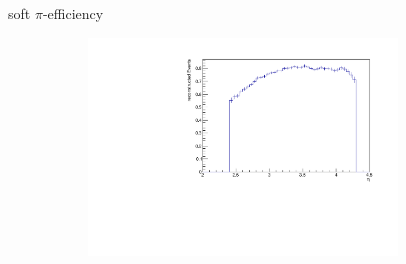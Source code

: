 \documentclass[11pt]{beamer}
\begin{document}
\begin{frame}{soft $\pi$-efficiency}
\begin{figure}
\begin{subfigure}{0.45\textwidth}
\end{subfigure}
\begin{subfigure}{0.45\textwidth}
\includegraphics[width=0.9\textwidth]{up_pdf/neg/h_eta_reco_SPi_neg.pdf}
\end{subfigure}
\end{figure}
\end{frame}
\end{document}

